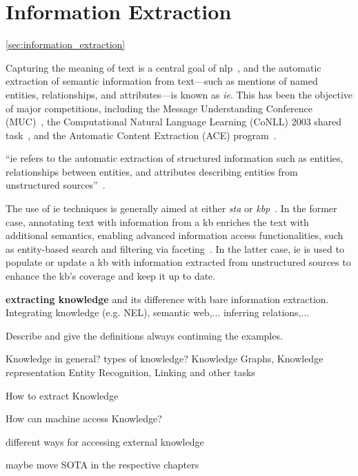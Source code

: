 \section{Information Extraction}
\ref{sec:information_extraction}

Capturing the meaning of text is a central goal of \acl{nlp}~\cite{entityorientedsearch2018balog}, and the automatic extraction of semantic information from text---such as mentions of named entities, relationships, and attributes---is known as \emph{\acl{ie}}. This has been the objective of major competitions, including the Message Understanding Conference (MUC)~\cite{muc_lessons_1998,muc6_overview_1995,muc7_overview_1998}, the Computational Natural Language Learning (CoNLL) 2003 shared task~\cite{conll2003}, and the Automatic Content Extraction (ACE) program~\cite{ace_2004}.

\begin{definition}
``\Acf{ie} refers to the automatic extraction of structured information such as entities, relationships between entities, and attributes describing entities from unstructured sources''~\cite{infoextraction2008}.
\end{definition}
The use of \ac{ie} techniques is generally aimed at either \emph{\acl{sta}} or \emph{\acl{kbp}}~\cite{entityorientedsearch2018balog}.
In the former case, annotating text with information from a \ac{kb} enriches the text with additional semantics, enabling advanced information access functionalities, such as entity-based search and filtering via faceting~\cite{entityorientedsearch2018balog}.
In the latter case, \ac{ie} is used to populate or update a \ac{kb} with information extracted from unstructured sources to enhance the \ac{kb}'s coverage and keep it up to date.




\textbf{extracting knowledge} and its difference with bare information extraction. Integrating knowledge (e.g. NEL), semantic web,... inferring relations,...

Describe and give the definitions always continuing the examples.

Knowledge in general? types of knowledge? Knowledge Graphs, Knowledge representation
Entity Recognition, Linking and other tasks

How to extract Knowledge

How can machine access Knowledge?

different ways for accessing external knowledge

maybe move SOTA in the respective chapters
